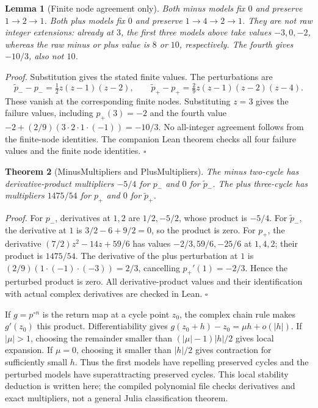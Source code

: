 \documentclass[11pt,letterpaper]{article}
\newtheorem{theorem}{Theorem}
\newtheorem{lemma}[theorem]{Lemma}
\newenvironment{proof}{\noindent\textit{Proof.}}{\hfill\(\square\)}
\begin{document}
\begin{lemma}[Finite node agreement only]
Both minus models fix \(0\) and preserve \(1\to2\to1\). Both plus models fix \(0\) and preserve \(1\to4\to2\to1\). They are not raw integer extensions: already at \(3\), the first three models above take values \(-3,0,-2\), whereas the raw minus or plus value is \(8\) or \(10\), respectively. The fourth gives \(-10/3\), also not \(10\).
\end{lemma}
\begin{proof}
Substitution gives the stated finite values. The perturbations are
\[
\widetilde p_--p_- =\tfrac12 z(z-1)(z-2),
\qquad \widetilde p_+-p_+ =\tfrac29 z(z-1)(z-2)(z-4).
\]
These vanish at the corresponding finite nodes. Substituting \(z=3\) gives the failure values, including \(p_+(3)=-2\) and the fourth value \(-2+(2/9)(3\cdot2\cdot1\cdot(-1))=-10/3\). No all-integer agreement follows from the finite-node identities. The companion Lean theorem checks all four failure values and the finite node identities.
\end{proof}

\begin{theorem}[MinusMultipliers and PlusMultipliers]
The minus two-cycle has derivative-product multipliers \(-5/4\) for \(p_-\) and \(0\) for \(\widetilde p_-\). The plus three-cycle has multipliers \(1475/54\) for \(p_+\) and \(0\) for \(\widetilde p_+\).
\end{theorem}
\begin{proof}
For \(p_-\), derivatives at \(1,2\) are \(1/2,-5/2\), whose product is \(-5/4\). For \(\widetilde p_-\), the derivative at \(1\) is \(3/2-6+9/2=0\), so the product is zero. For \(p_+\), the derivative \((7/2)z^2-14z+59/6\) has values \(-2/3,59/6,-25/6\) at \(1,4,2\); their product is \(1475/54\). The derivative of the plus perturbation at \(1\) is \((2/9)(1\cdot(-1)\cdot(-3))=2/3\), cancelling \(p_+'(1)=-2/3\). Hence the perturbed product is zero. All derivative-product values and their identification with actual complex derivatives are checked in Lean.
\end{proof}

If \(g=p^{\circ n}\) is the return map at a cycle point \(z_0\), the complex chain rule makes \(g'(z_0)\) this product. Differentiability gives \(g(z_0+h)-z_0=\mu h+o(|h|)\). If \(|\mu|>1\), choosing the remainder smaller than \((|\mu|-1)|h|/2\) gives local expansion. If \(\mu=0\), choosing it smaller than \(|h|/2\) gives contraction for sufficiently small \(h\). Thus the first models have repelling preserved cycles and the perturbed models have superattracting preserved cycles. This local stability deduction is written here; the compiled polynomial file checks derivatives and exact multipliers, not a general Julia classification theorem.
\end{document}
